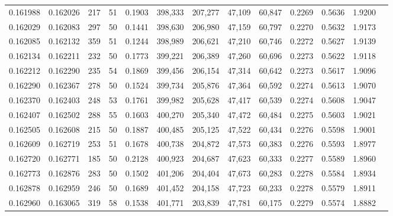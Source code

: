 \begin{tabular}{rrrrrrrrrrrrr}
0.161988 & 0.162026 &   217 &  51 &                                     0.1903 & 398,333 & 207,277 &  47,109 &  60,847 & 0.2269 & 0.5636 & 1.9200 \\
0.162029 & 0.162083 &   297 &  50 &                                     0.1441 & 398,630 & 206,980 &  47,159 &  60,797 & 0.2270 & 0.5632 & 1.9173 \\
0.162085 & 0.162132 &   359 &  51 &                                     0.1244 & 398,989 & 206,621 &  47,210 &  60,746 & 0.2272 & 0.5627 & 1.9139 \\
0.162134 & 0.162211 &   232 &  50 &                                     0.1773 & 399,221 & 206,389 &  47,260 &  60,696 & 0.2273 & 0.5622 & 1.9118 \\
0.162212 & 0.162290 &   235 &  54 &                                     0.1869 & 399,456 & 206,154 &  47,314 &  60,642 & 0.2273 & 0.5617 & 1.9096 \\
0.162290 & 0.162367 &   278 &  50 &                                     0.1524 & 399,734 & 205,876 &  47,364 &  60,592 & 0.2274 & 0.5613 & 1.9070 \\
0.162370 & 0.162403 &   248 &  53 &                                     0.1761 & 399,982 & 205,628 &  47,417 &  60,539 & 0.2274 & 0.5608 & 1.9047 \\
0.162407 & 0.162502 &   288 &  55 &                                     0.1603 & 400,270 & 205,340 &  47,472 &  60,484 & 0.2275 & 0.5603 & 1.9021 \\
0.162505 & 0.162608 &   215 &  50 &                                     0.1887 & 400,485 & 205,125 &  47,522 &  60,434 & 0.2276 & 0.5598 & 1.9001 \\
0.162609 & 0.162719 &   253 &  51 &                                     0.1678 & 400,738 & 204,872 &  47,573 &  60,383 & 0.2276 & 0.5593 & 1.8977 \\
0.162720 & 0.162771 &   185 &  50 &                                     0.2128 & 400,923 & 204,687 &  47,623 &  60,333 & 0.2277 & 0.5589 & 1.8960 \\
0.162773 & 0.162876 &   283 &  50 &                                     0.1502 & 401,206 & 204,404 &  47,673 &  60,283 & 0.2278 & 0.5584 & 1.8934 \\
0.162878 & 0.162959 &   246 &  50 &                                     0.1689 & 401,452 & 204,158 &  47,723 &  60,233 & 0.2278 & 0.5579 & 1.8911 \\
0.162960 & 0.163065 &   319 &  58 &                                     0.1538 & 401,771 & 203,839 &  47,781 &  60,175 & 0.2279 & 0.5574 & 1.8882 \\

\end{tabular}
